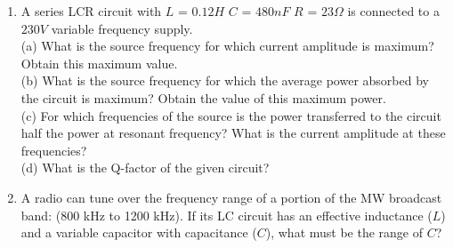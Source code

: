 \begin{enumerate}[label=\thesection.\arabic*,ref=\thesection.\theenumi]
\item A series LCR circuit with 
$L$ = $0.12 H$
$C$ = $480 nF$
$R$ = $23 \Omega$
is connected to a $230 V$ variable frequency supply.\\
(a) What is the source frequency for which current amplitude is maximum? Obtain this maximum value.\\
(b) What is the source frequency for which the average power absorbed by the circuit is maximum? Obtain the value of this maximum power.\\
(c) For which frequencies of the source is the power transferred to the circuit half the power at resonant frequency? What is the current amplitude at these frequencies?\\
(d) What is the Q-factor of the given circuit?\\
\solution

\pagebreak
\item A radio can tune over the frequency range of a portion of the MW broadcast band: (800 kHz to 1200 kHz). If its LC circuit has an effective inductance (\(L\)) and a variable capacitor with capacitance (\(C\)), what must be the range of \(C\)?\\
\solution
\pagebreak
\end{enumerate}
